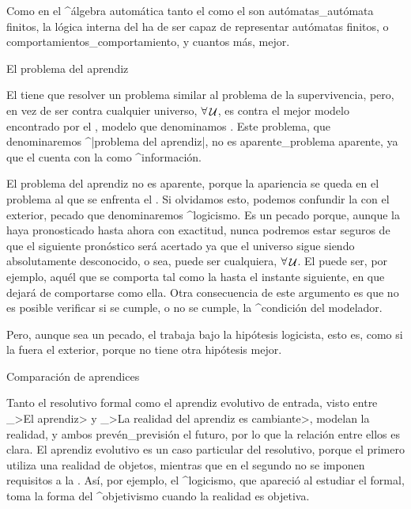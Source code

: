 Como en el ^{álgebra automática} tanto el {\universo} como el {\cuerpo}
son autómatas_{autómata} finitos, la lógica interna del {\aprendiz} ha
de ser capaz de representar autómatas finitos, o
comportamientos_{comportamiento}, y cuantos más, mejor.


\Section El problema del aprendiz

El {\simulador} tiene que resolver un problema similar al problema de la
supervivencia, pero, en vez de ser contra cualquier universo, $\forall
\aut U$, es contra el mejor modelo encontrado por el {\modelador}, modelo
que denominamos {\realidad}. Este problema, que denominaremos ^|problema
del aprendiz|, no es aparente_{problema aparente}, ya que el
{\simulador} cuenta con la {\realidad} como ^{información}.


El problema del aprendiz no es aparente, porque la apariencia se queda
en el problema al que se enfrenta el {\modelador}. Si olvidamos esto,
podemos confundir la {\realidad} con el {\universo} exterior, pecado que
denominaremos ^{logicismo}. Es un pecado porque, aunque la {\realidad}
haya pronosticado hasta ahora con exactitud, nunca podremos estar
seguros de que el siguiente pronóstico será acertado ya que el universo
sigue siendo absolutamente desconocido, o sea, puede ser cualquiera,
$\forall \aut U$. El {\universo} puede ser, por ejemplo, aquél que se
comporta tal como la {\realidad} hasta el instante siguiente, en que
dejará de comportarse como ella. Otra consecuencia de este argumento es
que no es posible verificar si se cumple, o no se cumple, la ^{condición
del modelador}.

Pero, aunque sea un pecado, el {\simulador} trabaja bajo la hipótesis
logicista, esto es, como si la {\realidad} fuera el {\universo}
exterior, porque no tiene otra hipótesis mejor.


\Section Comparación de aprendices

Tanto el {\aprendiz} resolutivo formal como el aprendiz evolutivo de
entrada, visto entre _>El aprendiz> y _>La realidad del aprendiz es
cambiante>, modelan la realidad, y ambos prevén_{previsión} el futuro,
por lo que la relación entre ellos es clara. El aprendiz evolutivo es un
caso particular del {\aprendiz} resolutivo, porque el primero utiliza
una realidad de objetos, mientras que en el segundo no se imponen
requisitos a la {\realidad}. Así, por ejemplo, el ^{logicismo}, que
apareció al estudiar el {\aprendiz} formal, toma la forma del
^{objetivismo} cuando la realidad es objetiva.

